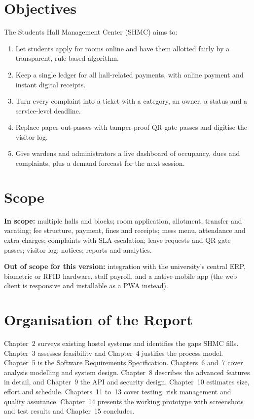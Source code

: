 \documentclass[11pt,a4paper]{report}
\begin{document}
\section{Objectives}
The Students Hall Management Center (SHMC) aims to:
\begin{enumerate}
  \item Let students apply for rooms online and have them allotted fairly by a transparent, rule-based algorithm.
  \item Keep a single ledger for all hall-related payments, with online payment and instant digital receipts.
  \item Turn every complaint into a ticket with a category, an owner, a status and a service-level deadline.
  \item Replace paper out-passes with tamper-proof QR gate passes and digitise the visitor log.
  \item Give wardens and administrators a live dashboard of occupancy, dues and complaints, plus a demand forecast for the next session.
\end{enumerate}

\section{Scope}
\textbf{In scope:} multiple halls and blocks; room application, allotment, transfer and vacating; fee structure, payment, fines and receipts; mess menu, attendance and extra charges; complaints with SLA escalation; leave requests and QR gate passes; visitor log; notices; reports and analytics.

\textbf{Out of scope for this version:} integration with the university's central ERP, biometric or RFID hardware, staff payroll, and a native mobile app (the web client is responsive and installable as a PWA instead).

\section{Organisation of the Report}
Chapter~2 surveys existing hostel systems and identifies the gaps SHMC fills. Chapter~3 assesses feasibility and Chapter~4 justifies the process model. Chapter~5 is the Software Requirements Specification. Chapters~6 and~7 cover analysis modelling and system design. Chapter~8 describes the advanced features in detail, and Chapter~9 the API and security design. Chapter~10 estimates size, effort and schedule. Chapters~11 to~13 cover testing, risk management and quality assurance. Chapter~14 presents the working prototype with screenshots and test results and Chapter~15 concludes.
\end{document}
